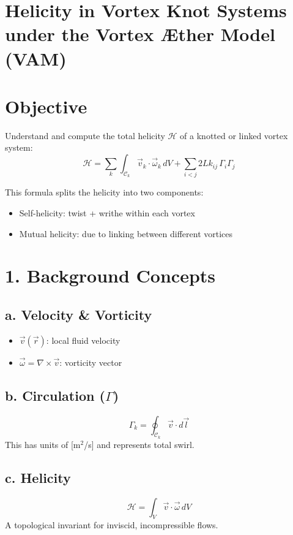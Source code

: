 \documentclass[11pt]{article}
\begin{document}
    \section{Helicity in Vortex Knot Systems under the Vortex \AE{}ther Model (VAM)}

    \section*{Objective}
    Understand and compute the total helicity $\mathcal{H}$ of a knotted or linked vortex system:
    \begin{equation}
        \boxed{
            \mathcal{H} = \sum_{k} \int_{\mathcal{C}_k} \vec{v}_k \cdot \vec{\omega}_k \, dV + \sum_{i<j} 2Lk_{ij} \, \Gamma_i \Gamma_j
        }
    \end{equation}

    This formula splits the helicity into two components:
    \begin{itemize}
        \item Self-helicity: twist + writhe within each vortex
        \item Mutual helicity: due to linking between different vortices
    \end{itemize}

    \section*{1. Background Concepts}
    \subsection*{a. Velocity \& Vorticity}
    \begin{itemize}
        \item $\vec{v}(\vec{r})$: local fluid velocity
        \item $\vec{\omega} = \nabla \times \vec{v}$: vorticity vector
    \end{itemize}

    \subsection*{b. Circulation ($\Gamma$)}
    \begin{equation}
        \Gamma_k = \oint_{\mathcal{C}_k} \vec{v} \cdot d\vec{l}
    \end{equation}
    This has units of [m$^2$/s] and represents total swirl.

    \subsection*{c. Helicity}
    \begin{equation}
        \mathcal{H} = \int_V \vec{v} \cdot \vec{\omega} \, dV
    \end{equation}
    A topological invariant for inviscid, incompressible flows.
\end{document}
